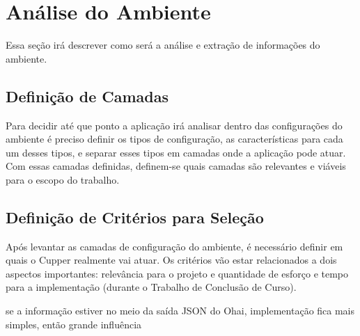 \section{Análise do Ambiente}
Essa seção irá descrever como será a análise e extração de informações do ambiente. 


\subsection{Definição de Camadas}
Para decidir até que ponto a aplicação irá analisar dentro das configurações
do ambiente é preciso definir os tipos de configuração, as características para
cada um desses tipos, e separar esses tipos em camadas onde a aplicação pode atuar.
Com essas camadas definidas, definem-se quais camadas são relevantes e viáveis
para o escopo do trabalho.

\subsection{Definição de Critérios para Seleção}
\label{sec:defcritcamada}
Após levantar as camadas de configuração do ambiente, é necessário definir em
quais o Cupper realmente vai atuar. Os critérios vão estar relacionados a dois
aspectos importantes: relevância para o projeto e quantidade de esforço e tempo
para a implementação (durante o Trabalho de Conclusão de Curso).


{\color{red} se a informação estiver no meio da saída JSON do Ohai, implementação fica mais
simples, então grande influência}


